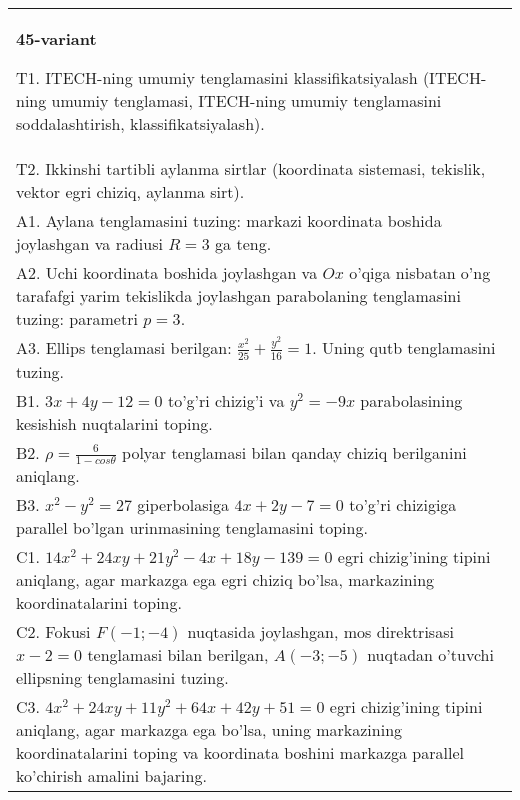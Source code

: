 \documentclass{article}
\begin{document}
\begin{tabular}{m{17cm}}
\textbf{45-variant}
\newline

T1. ITECH-ning umumiy tenglamasini klassifikatsiyalash (ITECH-ning umumiy tenglamasi, ITECH-ning umumiy tenglamasini soddalashtirish, klassifikatsiyalash).\\

T2. Ikkinshi tartibli aylanma sirtlar (koordinata sistemasi, tekislik, vektor egri chiziq, aylanma sirt).\\

A1. Aylana tenglamasini tuzing: markazi koordinata boshida joylashgan va radiusi $R=3$ ga teng.\\

A2. Uchi koordinata boshida joylashgan va $Ox$ o'qiga nisbatan o'ng tarafafgi yarim tekislikda joylashgan parabolaning tenglamasini tuzing: parametri $p=3$.\\

A3. Ellips tenglamasi berilgan: $\frac{x^2}{25}+\frac{y^2}{16}=1$. Uning qutb tenglamasini tuzing.\\

B1. $3x + 4y - 12 = 0$ to'g'ri chizig'i va $y^{2} = - 9x$ parabolasining kesishish nuqtalarini toping.\\

B2. $\rho = \frac{6}{1 - cos\theta}$ polyar tenglamasi bilan qanday chiziq berilganini aniqlang.  \\

B3. $x^{2} - y^{2} = 27$ giperbolasiga $4x + 2y - 7 = 0$ to'g'ri chizigiga parallel bo'lgan urinmasining tenglamasini toping.  \\

C1. $14x^{2} + 24xy + 21y^{2} - 4x + 18y - 139 = 0$ egri chizig'ining tipini aniqlang, agar markazga ega egri chiziq bo'lsa, markazining koordinatalarini toping.  \\

C2. Fokusi $F( - 1; - 4)$ nuqtasida joylashgan, mos direktrisasi $x - 2 = 0$ tenglamasi bilan berilgan, $A( - 3; - 5)$ nuqtadan o'tuvchi ellipsning tenglamasini tuzing.  \\

C3. $4x^{2} + 24xy + 11y^{2} + 64x + 42y + 51 = 0$ egri chizig'ining tipini aniqlang, agar markazga ega bo'lsa, uning markazining koordinatalarini toping va koordinata boshini markazga parallel ko'chirish amalini bajaring.\\

\end{tabular}
\vspace{1cm}
\end{document}
